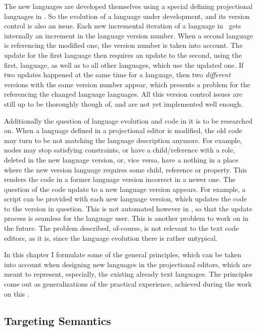   The new languages are developed themselves using a special defining projectional languages in \jbmps. So the evolution of a language under development,
  and its version control is also an issue. Each new incremental iteration of a language in \jbmps\ gets internally an increment in the language
  version number. When a second language is referencing the modified one, the version number is taken into account. The update for the first language
  then requires an update to the second, using the first,  language, as well as to all other languages, which use the updated one. If two updates happened
  at the same time for a language, then two \emph{different} versions with the same version number appear, which presents a problem for the 
  referencing the changed language languages. All this version control issues are still up to be thoroughly though of, and are not yet 
  implemented well enough.

  Additionally the question of language evolution and code in it is to be researched on.  When a language defined in a projectional editor is
  modified, the old code may turn to be not matching the language description anymore. For example, nodes may stop satisfying constraints,
  or have a child/reference with a role, deleted in the new language version, or, vice versa, have a nothing in a place where the new
  version language requires some child, reference or property. This renders the code in a former language version incorrect in a newer one.
  The question of the code update to a new language version appears. For example, a script can be provided with each new language version,
  which updates the code to the version in question. This is not automated however in \jbmps, so that the update process is seamless for the 
  language user. This is another problem to work on in the future. The problem described, of-course, is not relevant to the text code editors,
  as it is, since the language evolution there is rather untypical.


In this chapter I formulate some of the general principles, which can be taken into
account when designing new languages in the projectional editors, which are meant to represent, especially,
the existing already text languages. The principles come out as generalizations of the practical experience,
achieved during the work on this \MT.

\subsection{Targeting Semantics}

